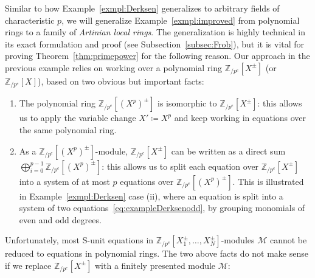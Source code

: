 \documentclass[letterpaper, 11pt, thm-restate]{article}
\numberwithin{equation}{section}
\newcommand{\Zpe}{\mathbb{Z}_{/p^e}}
\newcommand{\mM}{\mathcal{M}}
\theoremstyle{definition}
\theoremstyle{definition}
\theoremstyle{definition}
\begin{document}
Similar to how Example~\ref{exmpl:Derksen} generalizes to arbitrary fields of characteristic $p$, we will generalize Example~\ref{exmpl:improved} from polynomial rings to a family of \emph{Artinian local rings}.
The generalization is highly technical in its exact formulation and proof (see Subsection~\ref{subsec:Frob}), but it is vital for proving Theorem~\ref{thm:primepower} for the following reason.
Our approach in the previous example relies on working over a polynomial ring $\Zpe[X^{\pm}]$ (or $\Zpe[X]$), based on two obvious but important facts:
\begin{enumerate}[nosep]
    \item The polynomial ring $\Zpe[(X^p)^{\pm}]$ is isomorphic to $\Zpe[X^{\pm}]$: this allows us to apply the variable change $X' \coloneqq X^p$ and keep working in equations over the same polynomial ring.
    \item As a $\Zpe[(X^p)^{\pm}]$-module, $\Zpe[X^{\pm}]$ can be written as a direct sum $\bigoplus_{i = 0}^{p-1} \Zpe[(X^p)^{\pm}]$: this allows us to split each equation over $\Zpe[X^{\pm}]$ into a system of at most $p$ equations over $\Zpe[(X^p)^{\pm}]$. This is illustrated in Example~\ref{exmpl:Derksen} case (ii), where an equation is split into a system of two equations~\eqref{eq:exampleDerksenodd}, by grouping monomials of even and odd degrees.
\end{enumerate}
Unfortunately, most S-unit equations in $\Zpe[X_1^{\pm}, \ldots, X_N^{\pm}]$-modules $\mM$ cannot be reduced to equations in polynomial rings.
The two above facts do not make sense if we replace $\Zpe[X^{\pm}]$ with a finitely presented module $\mM$:
\end{document}
